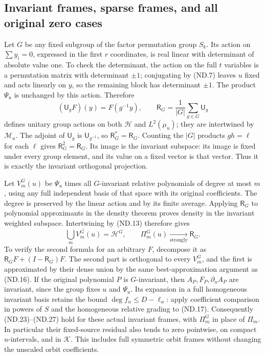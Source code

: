 \subsection{Invariant frames, sparse frames, and all original zero cases}

Let \(G\) be any fixed subgroup of the factor permutation group
\(S_k\). Its action on \(\sum y_i=0\), expressed in the first
\(r\) coordinates, is real linear with determinant of absolute value
one. To check the determinant, the action on the full \(t\) variables
is a permutation matrix with determinant \(\pm1\); conjugating by
(ND.7) leaves \(u\) fixed and acts linearly on \(y\), so the
remaining block has determinant \(\pm1\). The product \(\Psi_u\)
is unchanged by this action. Therefore
\[
 (\mathsf U_gF)(y)=F(g^{-1}y),\qquad
 \mathsf R_G=\frac1{|G|}\sum_{g\in G}\mathsf U_g
 \tag{ND.29}
\]
defines unitary group actions on both \(\mathscr H\) and
\(L^2(\mu_u)\); they are intertwined by \(\mathcal M_u\).
The adjoint of \(\mathsf U_g\) is \(\mathsf U_{g^{-1}}\), so
\(\mathsf R_G^*=\mathsf R_G\). Counting the \(|G|\) products
\(gh=\ell\) for each \(\ell\) gives \(\mathsf R_G^2=\mathsf R_G\).
Its image is the invariant subspace: its image is fixed under every
group element, and its value on a fixed vector is that vector.
Thus it is exactly the invariant orthogonal projection.

Let \(V_m^G(u)\) be \(\Psi_u\) times all \(G\)-invariant
relative polynomials of degree at most \(m\), using any full
independent basis of that space with its original coefficients.
The degree is preserved by the linear action and by its finite average.
Applying \(\mathsf R_G\) to polynomial approximants in the density
theorem proves density in the invariant weighted subspace. Intertwining
by (ND.13) therefore gives
\[
 \overline{\bigcup_m V_m^G(u)}=\mathscr H^G,\qquad
 \Pi_m^G(u)\xrightarrow[\text{strongly}]{}\mathsf R_G.
 \tag{ND.30}
\]
To verify the second formula for an arbitrary \(F\), decompose it
as \(\mathsf R_GF+(I-\mathsf R_G)F\). The second part is
orthogonal to every \(V_m^G\), and the first is approximated by
their dense union by the same best-approximation argument as (ND.16).
If the original polynomial \(P\) is \(G\)-invariant, then
\(A_P,F_P,\partial_uA_P\) are invariant, since the group fixes
\(u\) and \(\Psi_u\). Its expansion in a full homogeneous
invariant basis retains the bound \(\deg f_\alpha\le D-\ell_\alpha\):
apply coefficient comparison in powers of \(S\) and the homogeneous
relative grading to (ND.17). Consequently (ND.23)--(ND.27) hold
for these actual invariant frames, with \(\Pi_m^G\) in place of
\(\Pi_m\). In particular their fixed-source residual also tends
to zero pointwise, on compact \(u\)-intervals, and in \(\mathscr K\).
This includes full symmetric orbit frames without changing the
unscaled orbit coefficients.

